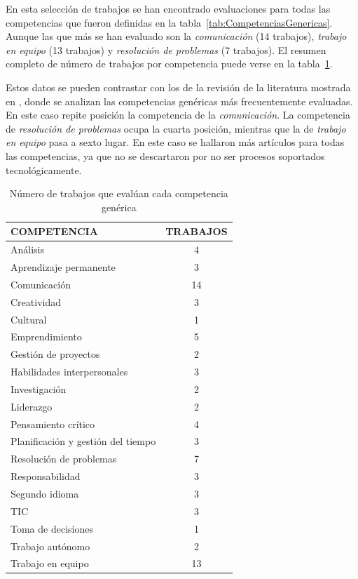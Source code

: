 En esta selección de trabajos se han encontrado evaluaciones para todas las competencias que fueron definidas en la tabla~\ref{tab:CompetenciasGenericas}. Aunque las que más se han evaluado son la \emph{comunicación} (14 trabajos), \emph{trabajo en equipo} (13 trabajos) y \emph{resolución de problemas} (7 trabajos). El resumen completo de número de trabajos por competencia puede verse en la tabla~\ref{tab:TrabajosCompetencia}.

Estos datos se pueden contrastar con los de la revisión de la literatura mostrada en \cite{strijbos2015criteria}, donde se analizan las competencias genéricas más frecuentemente evaluadas. En este caso repite posición la competencia de la \emph{comunicación}. La competencia de \emph{resolución de problemas} ocupa la cuarta posición, mientras que la de \emph{trabajo en equipo} pasa a sexto lugar. En este caso se hallaron más artículos para todas las competencias, ya que no se descartaron por no ser procesos soportados tecnológicamente. 


\begin{table}
  \begin{center}
  \begin{tabular}{| m{10cm} | c |}
    \hline
    COMPETENCIA & TRABAJOS\\
    \hline
    \hline
    Análisis & 4\\
    \hline
    Aprendizaje permanente & 3\\
    \hline
    Comunicación & 14\\
    \hline
    Creatividad & 3\\
    \hline
    Cultural & 1\\
    \hline
    Emprendimiento & 5\\
    \hline
    Gestión de proyectos & 2\\
    \hline
    Habilidades interpersonales & 3\\
    \hline
    Investigación & 2\\
    \hline
    Liderazgo & 2\\
    \hline
    Pensamiento crítico & 4\\
    \hline
    Planificación y gestión del tiempo & 3\\
    \hline
    Resolución de problemas & 7\\
    \hline
    Responsabilidad & 3\\
    \hline 
    Segundo idioma & 3\\
    \hline
    TIC & 3\\
    \hline
    Toma de decisiones & 1\\
    \hline
    Trabajo autónomo & 2\\
    \hline
    Trabajo en equipo & 13\\
    \hline
  \end{tabular}
\end{center}
\caption{Número de trabajos que evalúan cada competencia genérica}
\label{tab:TrabajosCompetencia}
\end{table} 

